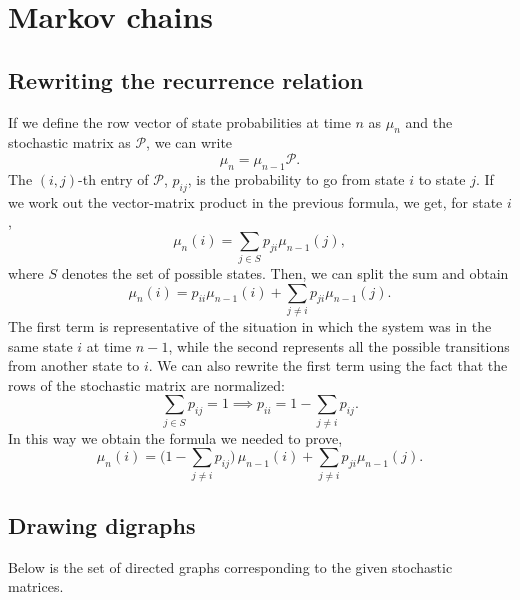 \chapter{Markov chains}

\section{Rewriting the recurrence relation}
If we define the row vector of state probabilities at time $n$ as $\mu_{n}$ and
the stochastic matrix as $\mathcal{P}$, we can write
\begin{equation}
  \mu_{n} = \mu_{n-1} \mathcal{P}.
\end{equation}
The $(i, j)$-th entry of $\mathcal{P}$, $p_{ij}$, is the probability to go from
state $i$ to state $j$. If we work out the vector-matrix product in the previous
formula, we get, for state $i$,
\begin{equation}
  \mu_{n}(i) = \sum_{j \in S} p_{ji} \mu_{n-1}(j),
\end{equation}
where $S$ denotes the set of possible states. Then, we can split the sum and
obtain
\begin{equation}
  \mu_{n}(i) = p_{ii} \mu_{n-1}(i) + \sum_{j \neq i} p_{ji} \mu_{n-1}(j).
\end{equation}
The first term is representative of the situation in which the system was in the
same state $i$ at time $n-1$, while the second represents all the possible
transitions from another state to $i$. We can also rewrite the first term using
the fact that the rows of the stochastic matrix are normalized:
\begin{equation}
  \sum_{j \in S} p_{ij} = 1 \implies p_{ii} = 1 - \sum_{j \neq i} p_{ij}.
\end{equation}
In this way we obtain the formula we needed to prove,
\begin{equation}
  \mu_{n}(i) = \biggl(1 - \sum_{j \neq i} p_{ij}\biggr)
  \, \mu_{n-1}(i) + \sum_{j \neq i} p_{ji} \mu_{n-1}(j).
\end{equation}

\section{Drawing digraphs}

Below is the set of directed graphs corresponding to the given stochastic
matrices.

